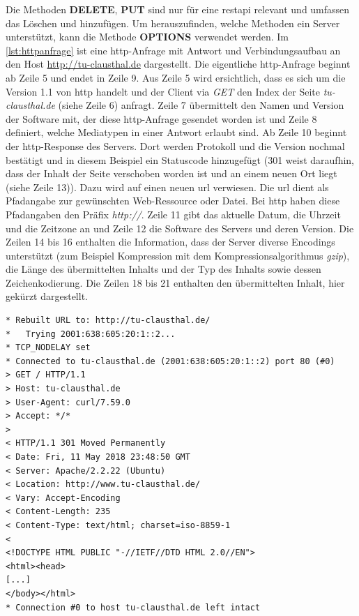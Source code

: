 \documentclass[titlepage]{report}
\begin{document}
Die Methoden \textbf{DELETE}, \textbf{PUT} sind nur für eine
\gls{restapi} relevant und umfassen das Löschen und hinzufügen. Um
herauszufinden, welche Methoden ein Server unterstützt, kann die Methode
\textbf{OPTIONS} verwendet werden.
Im \autoref{lst:httpanfrage} ist eine \gls{http}\hyp{}Anfrage mit Antwort und
Verbindungsaufbau an den Host \url{http://tu-clausthal.de}
dargestellt. Die eigentliche \gls{http}\hyp{}Anfrage beginnt ab Zeile 5
und endet in Zeile 9. Aus Zeile 5 wird ersichtlich, dass es sich um die
Version 1.1 von \gls{http} handelt und der Client via \emph{GET} den
Index der Seite \emph{tu-clausthal.de} (siehe Zeile 6) anfragt. Zeile 7
übermittelt den Namen und Version der Software mit, der diese
\gls{http}\hyp{}Anfrage gesendet worden ist und Zeile 8 definiert,
welche Mediatypen in einer Antwort erlaubt sind\cite{RFC2616}. Ab Zeile
10 beginnt der \gls{http}\hyp{}Response des  Servers. Dort werden Protokoll und die
Version nochmal bestätigt und in diesem Beispiel ein Statuscode
hinzugefügt (301 weist daraufhin, dass der Inhalt der Seite verschoben
worden ist und an einem neuen Ort liegt (siehe Zeile 13)). Dazu wird auf
einen neuen \gls{url} verwiesen. Die \gls{url} dient als Pfadangabe zur
gewünschten Web\hyp{}Ressource oder Datei. Bei \gls{http} haben diese
Pfadangaben den Präfix \emph{http://}. Zeile 11 gibt
das aktuelle Datum, die Uhrzeit und die Zeitzone an und Zeile 12 die
Software des Servers und deren Version. Die Zeilen 14 bis 16
enthalten die Information, dass der Server diverse Encodings unterstützt
(zum Beispiel Kompression mit dem Kompressionsalgorithmus \emph{gzip}),
die Länge des übermittelten Inhalts und der Typ des Inhalts sowie dessen
Zeichenkodierung. Die Zeilen 18 bis 21 enthalten den übermittelten
Inhalt, hier gekürzt dargestellt.
\begin{minipage}{\linewidth}
\begin{lstlisting}[caption={Eine HTTP-Anfrage an
http://tu-clausthal.de},label={lst:httpanfrage}]
* Rebuilt URL to: http://tu-clausthal.de/
*   Trying 2001:638:605:20:1::2...
* TCP_NODELAY set
* Connected to tu-clausthal.de (2001:638:605:20:1::2) port 80 (#0)
> GET / HTTP/1.1
> Host: tu-clausthal.de
> User-Agent: curl/7.59.0
> Accept: */*
>
< HTTP/1.1 301 Moved Permanently
< Date: Fri, 11 May 2018 23:48:50 GMT
< Server: Apache/2.2.22 (Ubuntu)
< Location: http://www.tu-clausthal.de/
< Vary: Accept-Encoding
< Content-Length: 235
< Content-Type: text/html; charset=iso-8859-1
<
<!DOCTYPE HTML PUBLIC "-//IETF//DTD HTML 2.0//EN">
<html><head>
[...]
</body></html>
* Connection #0 to host tu-clausthal.de left intact
\end{lstlisting}
\end{minipage}
\end{document}
